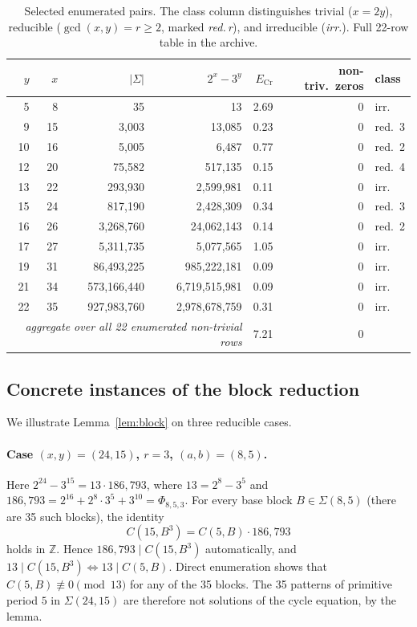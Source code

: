 \documentclass[11pt,a4paper]{article}
\theoremstyle{plain}
\theoremstyle{definition}
\begin{document}
\begin{table}[h]
\centering
\small
\caption{Selected enumerated pairs. The class column distinguishes
trivial ($x = 2 y$), reducible ($\gcd(x, y) = r \ge 2$, marked
\emph{red.\,r}), and irreducible (\emph{irr.}). Full 22-row table in the archive.}
\label{tab:agg}
\begin{tabular}{rrrrrrl}
\toprule
$y$ & $x$ & $|\Sigma|$ & $2^x - 3^y$ & $E_\mathrm{Cr}$ & non-triv.\ zeros & class \\
\midrule
5  & 8  & 35           & 13            & 2.69 & 0 & irr.\ \\
9  & 15 & 3{,}003      & 13{,}085      & 0.23 & 0 & red.\ 3 \\
10 & 16 & 5{,}005      & 6{,}487       & 0.77 & 0 & red.\ 2 \\
12 & 20 & 75{,}582     & 517{,}135     & 0.15 & 0 & red.\ 4 \\
13 & 22 & 293{,}930    & 2{,}599{,}981 & 0.11 & 0 & irr.\ \\
15 & 24 & 817{,}190    & 2{,}428{,}309 & 0.34 & 0 & red.\ 3 \\
16 & 26 & 3{,}268{,}760 & 24{,}062{,}143 & 0.14 & 0 & red.\ 2 \\
17 & 27 & 5{,}311{,}735 & 5{,}077{,}565 & 1.05 & 0 & irr.\ \\
19 & 31 & 86{,}493{,}225 & 985{,}222{,}181 & 0.09 & 0 & irr.\ \\
21 & 34 & 573{,}166{,}440 & 6{,}719{,}515{,}981 & 0.09 & 0 & irr.\ \\
22 & 35 & 927{,}983{,}760 & 2{,}978{,}678{,}759 & 0.31 & 0 & irr.\ \\
\midrule
\multicolumn{4}{r}{\textit{aggregate over all 22 enumerated non-trivial rows}}
& 7.21 & 0 & \\
\bottomrule
\end{tabular}
\end{table}

\subsection{Concrete instances of the block reduction}\label{sec:instances}

We illustrate Lemma~\ref{lem:block} on three reducible cases.

\paragraph{Case $(x, y) = (24, 15)$, $r = 3$, $(a, b) = (8, 5)$.}
Here
$2^{24} - 3^{15} = 13 \cdot 186{,}793$,
where $13 = 2^8 - 3^5$ and
$186{,}793 = 2^{16} + 2^8 \cdot 3^5 + 3^{10} = \Phi_{8, 5, 3}$.
For every base block $B \in \Sigma(8, 5)$ (there are 35 such blocks), the
identity
\[
C(15, B^3) = C(5, B) \cdot 186{,}793
\]
holds in $\mathbb{Z}$. Hence $186{,}793 \mid C(15, B^3)$ automatically, and
$13 \mid C(15, B^3) \iff 13 \mid C(5, B)$. Direct enumeration shows that
$C(5, B) \not\equiv 0 \pmod{13}$ for any of the 35 blocks. The 35 patterns
of primitive period $5$ in $\Sigma(24, 15)$ are therefore not solutions of
the cycle equation, by the lemma.
\end{document}
